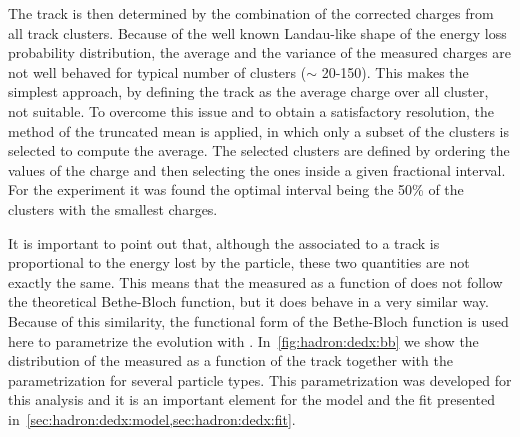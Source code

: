 The track \dedx is then determined by the combination of the corrected 
charges from all track clusters. Because of the well known Landau-like shape of the
energy loss probability distribution, the average and the variance
of the measured charges are not well behaved for typical number of clusters
($\sim$ 20-150). This makes the simplest approach, by defining the track \dedx
as the average charge over all cluster, not suitable. 
To overcome this issue and to obtain a satisfactory \dedx resolution,
the method of the truncated mean is applied, in which only a subset of the clusters
is selected to compute the average. The selected clusters are defined by ordering
the values of the charge and then selecting the ones inside a given fractional interval.
For the \NASixtyOne experiment it was found the optimal interval being the 50\%
of the clusters with the smallest charges.~\cite{GaborVeresThesis}

It is important to point out that, although the \dedx associated to
a track is proportional to the energy lost by the particle,
these two quantities are not exactly the same. This
means that the measured \meandedx as a function of \pp
does not follow the theoretical Bethe-Bloch function, but it does
behave in a very similar way. Because of this similarity,
the functional form of the Bethe-Bloch function
is used here to parametrize the \meandedx evolution
with \pp. In~\cref{fig:hadron:dedx:bb} we show the distribution of
the measured \dedx as a function of the track \pp
together with the \meandedx parametrization for 
several particle types. This parametrization was developed
for this analysis and it is an important element for the \dedx model
and the \dedx fit presented in~\cref{sec:hadron:dedx:model,sec:hadron:dedx:fit}.


